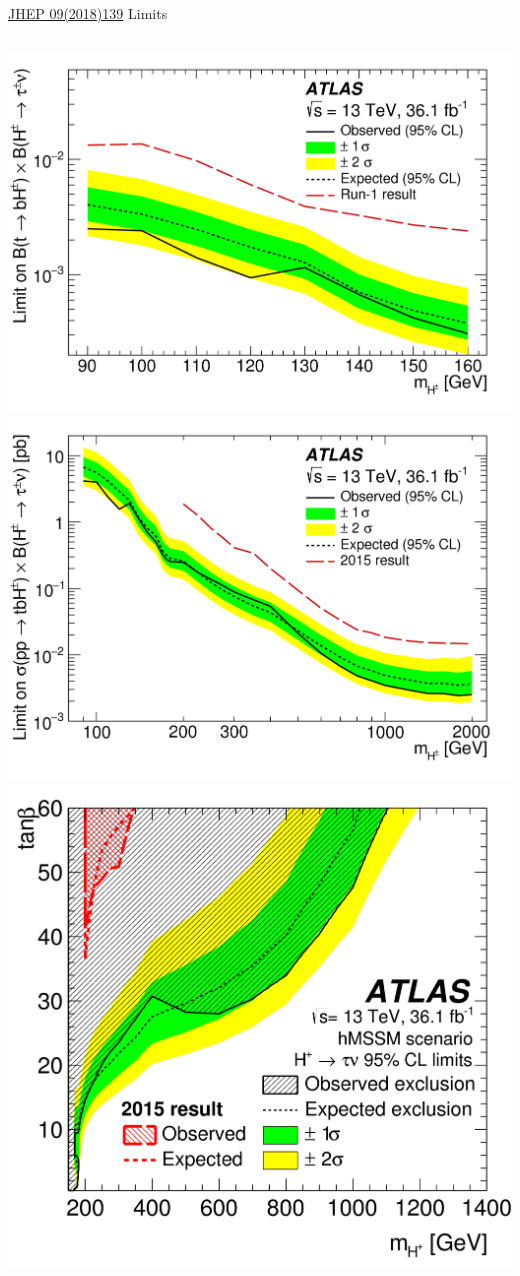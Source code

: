 \documentclass[aspectratio=169,xcolor=table]{beamer}
\begin{document}
    \begin{frame}{\href{https://link.springer.com/article/10.1007/JHEP09(2018)139}{JHEP 09(2018)139} Limits}
      \begin{columns}
        \centering
        \includegraphics[width=.65\textwidth,keepaspectratio=true]{Limits/Combined_low_NoLabel_2018.png}
        \includegraphics[width=.65\textwidth,keepaspectratio=true]{Limits/Combined_CrossSection_2018.png}
        \centering
        \includegraphics[width=\textwidth,keepaspectratio=true]{Limits/tanB_Limit_2018.png}
      \end{columns}
    \end{frame}
\end{document}
